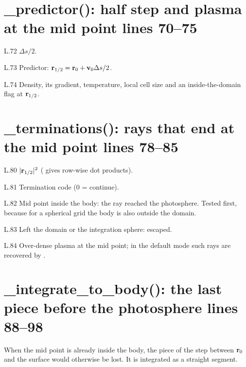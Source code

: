 \section*{\normalsize \_predictor(): half step and plasma at the mid point \hfill{\small\mdseries\color{gray}lines 70--75}}

\begin{lines}
\item[L.72] $\Delta s/2$.
\item[L.73] Predictor: $\mathbf{r}_{1/2}=\mathbf{r}_0+\mathbf{v}_0\Delta s/2$.
\item[L.74] Density, its gradient, temperature, local cell size and an inside-the-domain flag at $\mathbf{r}_{1/2}$.
\end{lines}
\section*{\normalsize \_terminations(): rays that end at the mid point \hfill{\small\mdseries\color{gray}lines 78--85}}

\begin{lines}
\item[L.80] $|\mathbf{r}_{1/2}|^2$ ( gives row-wise dot products).
\item[L.81] Termination code (0 = continue).
\item[L.82] Mid point inside the body: the ray reached the photosphere. Tested first, because for a spherical grid the body is also outside the domain.
\item[L.83] Left the domain or the integration sphere: escaped.
\item[L.84] Over-dense plasma at the mid point; in the default mode such rays are recovered by .
\end{lines}
\section*{\normalsize \_integrate\_to\_body(): the last piece before the photosphere \hfill{\small\mdseries\color{gray}lines 88--98}}

When the mid point is already inside the body, the piece of the step between $\mathbf{r}_0$ and the surface would otherwise be lost. It is integrated as a straight segment.


